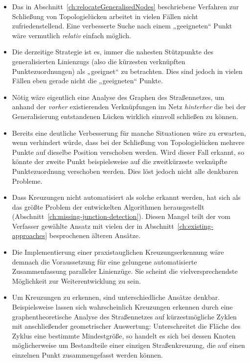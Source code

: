 \documentclass[../main/thesis.tex]{subfiles}
\begin{document}
\begin{itemize}

\item
Das in Abschnitt~\ref{ch:relocateGeneralisedNodes} beschriebene Verfahren zur Schließung von Topologielücken arbeitet in vielen Fällen nicht zufriedenstellend. Eine verbesserte Suche nach einem „geeigneten“ Punkt wäre vermutlich \emph{relativ} einfach möglich.

\item
Die derzeitige Strategie ist es, immer die nahesten Stützpunkte des generalisierten Linienzugs (also die kürzesten verknüpften Punktezuordnungen) als „geeignet“ zu betrachten.
Dies sind jedoch in vielen Fällen eben gerade nicht die „geeigneten“ Punkte.

\item
Nötig wäre eigentlich eine Analyse des Graphen des Straßennetzes, um anhand der \emph{vorher} existierenden Verknüpfungen im Netz \emph{hinterher} die bei der Generalisierung entstandenen Lücken wirklich sinnvoll schließen zu können.

\item
Bereits eine deutliche Verbesserung für manche Situationen wäre zu erwarten, wenn verhindert würde, dass bei der Schließung von Topologielücken mehrere Punkte auf dieselbe Position verschoben werden.
Wird dieser Fall erkannt, so könnte der zweite Punkt beispielsweise auf die zweitkürzeste verknüpfte Punktezuordnung verschoben werden.
Dies löst jedoch nicht alle denkbaren Probleme.

\item
Dass Kreuzungen nicht automatisiert als solche erkannt werden, hat sich als das größte Problem der entwickelten Algorithmen herausgestellt (Abschnitt~\ref{ch:missing-junction-detection}).
Diesen Mangel teilt der vom Verfasser gewählte Ansatz mit vielen der in Abschnitt~\ref{ch:existing-approaches} besprochenen älteren Ansätze.

\item
Die Implementierung einer praxistauglichen Kreuzungserkennung wäre demnach die Voraussetzung für eine gelungene automatisierte Zusammenfassung paralleler Linienzüge.
Sie scheint die vielversprechendste Möglichkeit zur Weiterentwicklung zu sein.

\item
Um Kreuzungen zu erkennen, sind unterschiedliche Ansätze denkbar.
Beispielsweise lassen sich wahrscheinlich Kreuzungen erkennen durch eine graphentheoretische Analyse des Straßennetzes auf kürzestmögliche Zyklen mit anschließender geometrischer Auswertung:
Unterschreitet die Fläche des Zyklus eine bestimmte Mindestgröße, so handelt es sich bei dessen Knoten möglicherweise um Bestandteile einer einzigen Straßenkreuzung, die auf einen einzelnen Punkt zusammengefasst werden können.


\end{itemize}
\end{document}
